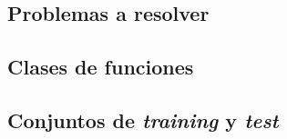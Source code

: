 \documentclass[a4paper, 20pt]{article}
\begin{document}
{\parskip=2pt
  \tableofcontents
}
\pagebreak

\section{}
\subsection{Problemas a resolver}

\subsection{Clases de funciones}

\subsection{Conjuntos de \textit{training} y \textit{test}}

\end{document}
